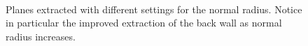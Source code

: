 \documentclass[11pt,a4paper]{kth-mag}
\begin{document}
\begin{figure}
  \centering
  \\
  \caption{Planes extracted with different settings for the normal radius.
    Notice in particular the improved extraction of the back wall as normal
    radius increases.}
  \label{fig:plane_normrad}
\end{figure}
\end{document}
